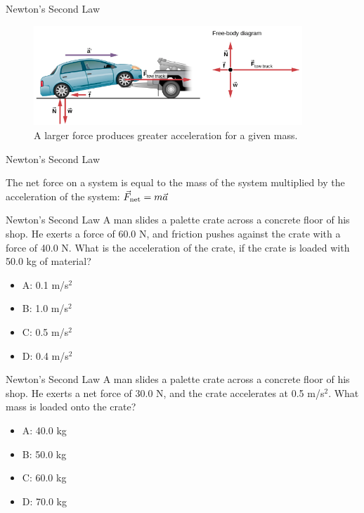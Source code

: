\documentclass{beamer}
\begin{document}
\begin{frame}{Newton's Second Law}
\begin{figure}
\centering
\includegraphics[width=0.9\textwidth]{figures/NewtonsSecond2.png}
\caption{\label{fig:newton2} A larger force produces greater acceleration for a given mass.}
\end{figure}
\end{frame}

\begin{frame}{Newton's Second Law}
\begin{tcolorbox}[colback=white,colframe=red!40!blue,title=Newton's Second Law]
\alert{The net force on a system is equal to the mass of the system multiplied by the acceleration of the system: $\vec{F}_{\rm net} = m \vec{a}$}
\end{tcolorbox}
\end{frame}

\begin{frame}{Newton's Second Law}
A man slides a palette crate across a concrete floor of his shop.  He exerts a force of 60.0 N, and friction pushes against the crate with a force of 40.0 N.  What is the acceleration of the crate, if the crate is loaded with 50.0 kg of material?
\begin{itemize}
\item A: 0.1 m/s$^2$
\item B: 1.0 m/s$^2$
\item C: 0.5 m/s$^2$
\item D: 0.4 m/s$^2$
\end{itemize}
\end{frame}

\begin{frame}{Newton's Second Law}
A man slides a palette crate across a concrete floor of his shop.  He exerts a net force of 30.0 N, and the crate accelerates at 0.5 m/s$^2$.  What mass is loaded onto the crate?
\begin{itemize}
\item A: 40.0 kg
\item B: 50.0 kg
\item C: 60.0 kg
\item D: 70.0 kg
\end{itemize}
\end{frame}
\end{document}
